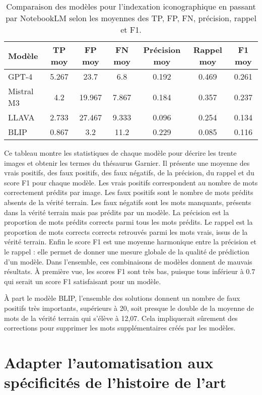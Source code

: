 \begin{table}[H]
\centering
\begin{tabular}{lcccccc}
\hline
Modèle & TP moy & FP moy & FN moy & Précision moy & Rappel moy & F1 moy \\
\hline
GPT-4 & 5.267 & 23.7 & 6.8 & 0.192 & 0.469 & 0.261 \\
Mistral M3 & 4.2 & 19.967 & 7.867 & 0.184 & 0.357 & 0.237 \\
LLAVA & 2.733 & 27.467 & 9.333 & 0.096 & 0.254 & 0.134 \\
BLIP & 0.867 & 3.2 & 11.2 & 0.229 & 0.085 & 0.116 \\
\hline
\end{tabular}
\caption{Comparaison des modèles pour l’indexation iconographique en passant par NotebookLM selon les moyennes des TP, FP, FN, précision, rappel et F1.}
\label{tab:resultats_modeles}
\end{table}

Ce tableau montre les statistiques de chaque modèle pour décrire les trente images et obtenir les termes du thésaurus Garnier. ​​Il présente une moyenne des vrais positifs, des faux positifs, des faux négatifs, de la précision, du rappel et du score F1 pour chaque modèle. Les vrais positifs correspondent au nombre de mots correctement prédits par image. Les faux positifs sont le nombre de mots prédits absents de la vérité terrain. Les faux négatifs sont les mots manquants, présents dans la vérité terrain mais pas prédits par un modèle. La précision est la proportion de mots prédits corrects parmi tous les mots prédits. Le rappel est la proportion de mots corrects corrects retrouvés parmi les mots vrais, issus de la vérité terrain. Enfin le score F1 est une moyenne harmonique entre la précision et le rappel : elle permet de donner une mesure globale de la qualité de prédiction d’un modèle. Dans l’ensemble, ces combinaisons de modèles donnent de mauvais résultats. À première vue, les scores F1 sont très bas, puisque tous inférieur à 0.7 qui serait un score F1 satisfaisant pour un modèle.

À part le modèle BLIP, l’ensemble des solutions donnent un nombre de faux positifs très importants, supérieurs à 20, soit presque le double de la moyenne de mots de la vérité terrain qui s’élève à 12,07. Cela impliquerait sûrement des corrections pour supprimer les mots supplémentaires créés par les modèles. 

\section[Automatisation et histoire de l'art]{Adapter l’automatisation aux spécificités de l’histoire de l’art}

